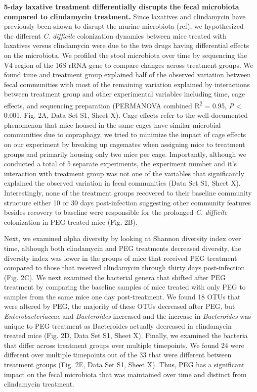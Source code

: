\documentclass[
  11pt,
]{article}
\begin{document}
\textbf{5-day laxative treatment differentially disrupts the fecal
microbiota compared to clindamycin treatment.} Since laxatives and
clindamycin have previously been shown to disrupt the murine microbiota
(ref), we hypothesized the different \emph{C. difficile} colonization
dynamics between mice treated with laxatives versus clindamycin were due
to the two drugs having differential effects on the microbiota. We
profiled the stool microbiota over time by sequencing the V4 region of
the 16S rRNA gene to compare changes across treatment groups. We found
time and treatment group explained half of the observed variation
between fecal communities with most of the remaining variation explained
by interactions between treatment group and other experimental variables
including time, cage effects, and sequencing preparation (PERMANOVA
combined R\textsuperscript{2} = 0.95, \emph{P} \textless{} 0.001, Fig.
2A, Data Set S1, Sheet X). Cage effects refer to the well-documented
phenomenon that mice housed in the same cages have similar microbial
communities due to copraphagy, we tried to minimize the impact of cage
effects on our experiment by breaking up cagemates when assigning mice
to treatment groups and primarily housing only two mice per cage.
Importantly, although we conducted a total of 5 separate experiments,
the experiment number and it's interaction with treatment group was not
one of the variables that significantly explained the observed variation
in fecal communities (Data Set S1, Sheet X). Interestingly, none of the
treatment groups recovered to their baseline community structure either
10 or 30 days post-infection suggesting other community features besides
recovery to baseline were responsible for the prolonged \emph{C.
difficile} colonization in PEG-treated mice (Fig. 2B).

Next, we examined alpha diversity by looking at Shannon diversity index
over time, although both clindamycin and PEG treatments decreased
diversity, the diversity index was lower in the groups of mice that
received PEG treatment compared to those that received clindamycin
through thirty days post-infection (Fig. 2C). We next examined the
bacterial genera that shifted after PEG treatment by comparing the
baseline samples of mice treated with only PEG to samples from the same
mice one day post-treatment. We found 18 OTUs that were altered by PEG,
the majority of these OTUs decreased after PEG, but
\emph{Enterobacteriaceae} and \emph{Bacteroides} increased and the
increase in \emph{Bacteroides} was unique to PEG treatment as
Bacteroides actually decreased in clindamycin treated mice (Fig. 2D,
Data Set S1, Sheet X). Finally, we examined the bacteria that differ
across treatment groups over multiple timepoints. We found 24 were
different over multiple timepoints out of the 33 that were different
between treatment groups (Fig. 2E, Data Set S1, Sheet X). Thus, PEG has
a significant impact on the fecal microbiota that was maintained over
time and distinct from clindamycin treatment.
\end{document}
